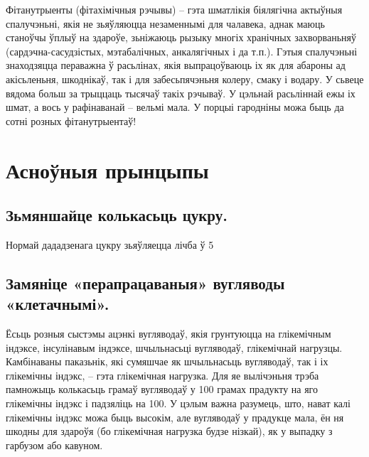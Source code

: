 Фітанутрыенты (фітахімічныя рэчывы) – гэта шматлікія біялягічна актыўныя спалучэньні, якія не зьяўляюцца незаменнымі для чалавека, аднак маюць станоўчы ўплыў на здароўе, зьніжаюць рызыку многіх хранічных захворваньняў (сардэчна-сасудзістых, мэтабалічных, анкалягічных і да т.п.). Гэтыя спалучэньні знаходзяцца пераважна ў расьлінах, якія выпрацоўваюць іх як для абароны ад акісьленьня, шкоднікаў, так і для забесьпячэньня колеру, смаку і водару. У сьвеце вядома больш за трыццаць тысячаў такіх рэчываў. У цэльнай расьліннай ежы іх шмат, а вось у рафінаванай – вельмі мала. У порцыі гародніны можа быць да сотні розных фітанутрыентаў!

\section{Асноўныя прынцыпы}

\subsection{Зьмяншайце колькасьць цукру.}
Нормай дададзенага цукру зьяўляецца лічба ў 5%

\subsection{Замяніце «перапрацаваныя» вугляводы «клетачнымі».}
Ёсьць розныя сыстэмы ацэнкі вугляводаў, якія грунтуюцца на глікемічным індэксе, інсулінавым індэксе, шчыльнасьці вугляводаў, глікемічнай нагрузцы. Камбінаваны паказьнік, які сумяшчае як шчыльнасьць вугляводаў, так і іх глікемічны індэкс, – гэта глікемічная нагрузка. Для яе вылічэньня трэба памножыць колькасьць грамаў вугляводаў у 100 грамах прадукту на яго глікемічны індэкс і падзяліць на 100. У цэлым важна разумець, што, нават калі глікемічны індэкс можа быць высокім, але вугляводаў у прадукце мала, ён ня шкодны для здароўя (бо глікемічная нагрузка будзе нізкай), як у выпадку з гарбузом або кавуном.

